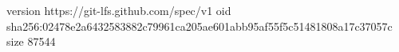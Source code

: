 version https://git-lfs.github.com/spec/v1
oid sha256:02478e2a6432583882c79961ca205ae601abb95af55f5c51481808a17c37057c
size 87544
